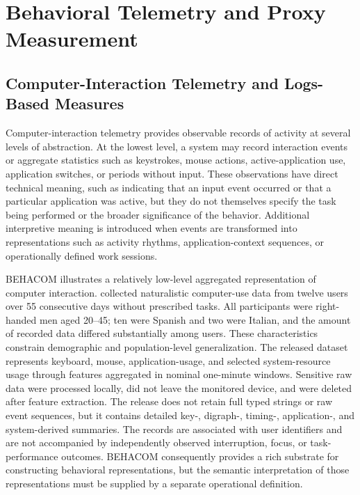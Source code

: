 \section{Behavioral Telemetry and Proxy Measurement}

\subsection{Computer-Interaction Telemetry and Logs-Based Measures}

Computer-interaction telemetry provides observable records of activity at several levels of abstraction. At the lowest level, a system may record interaction events or aggregate statistics such as keystrokes, mouse actions, active-application use, application switches, or periods without input. These observations have direct technical meaning, such as indicating that an input event occurred or that a particular application was active, but they do not themselves specify the task being performed or the broader significance of the behavior. Additional interpretive meaning is introduced when events are transformed into representations such as activity rhythms, application-context sequences, or operationally defined work sessions.

BEHACOM illustrates a relatively low-level aggregated representation of computer interaction. \textcite{sanchez2020behacom} collected naturalistic computer-use data from twelve users over 55 consecutive days without prescribed tasks. All participants were right-handed men aged 20--45; ten were Spanish and two were Italian, and the amount of recorded data differed substantially among users. These characteristics constrain demographic and population-level generalization. The released dataset represents keyboard, mouse, application-usage, and selected system-resource usage through features aggregated in nominal one-minute windows. Sensitive raw data were processed locally, did not leave the monitored device, and were deleted after feature extraction. The release does not retain full typed strings or raw event sequences, but it contains detailed key-, digraph-, timing-, application-, and system-derived summaries. The records are associated with user identifiers and are not accompanied by independently observed interruption, focus, or task-performance outcomes. BEHACOM consequently provides a rich substrate for constructing behavioral representations, but the semantic interpretation of those representations must be supplied by a separate operational definition.

